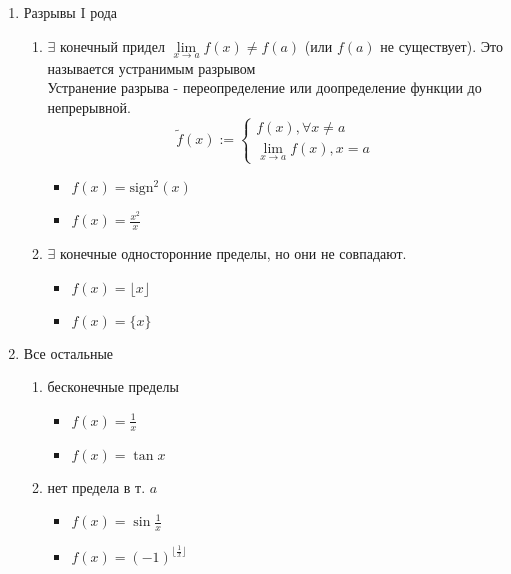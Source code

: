 \documentclass[11pt, a4paper]{article}
\def\lima{\lim \limits_{x \to a}}
\begin{document}
    \begin{enumerate}
        \item Разрывы I рода
        \begin{enumerate}
            \item $\exists$ конечный придел $\lima f(x) \neq f(a)$ (или $f(a)$ не существует). Это называется устранимым разрывом\\
            Устранение разрыва - переопределение или доопределение функции до непрерывной.
            $$\tilde{f}(x) := \begin{cases}
                f(x), \forall x \neq a \\
                \lima f(x), x = a
            \end{cases}$$
            \begin{itemize}
                \item $f(x) = \text{sign}^2 (x)$
                \item $f(x) = \frac{x^2}{x}$
            \end{itemize}
            \item $\exists$ конечные односторонние пределы, но они не совпадают.
            \begin{itemize}
                \item $f(x) = \lfloor x \rfloor$
                \item $f(x) = \{x\}$
            \end{itemize}
        \end{enumerate}
        \item Все остальные
        \begin{enumerate}
            \item бесконечные пределы
            \begin{itemize}
                \item $f(x) = \frac{1}{x}$
                \item $f(x) = \tan x$
            \end{itemize}
            \item нет предела в т. $a$
            \begin{itemize}
                \item $f(x) = \sin \frac{1}{x}$
                \item $f(x) = (-1)^{\lfloor \frac{1}{x} \rfloor}$
            \end{itemize}
        \end{enumerate}
        \begin{itemize}

\end{itemize}
\end{enumerate}
\end{document}
